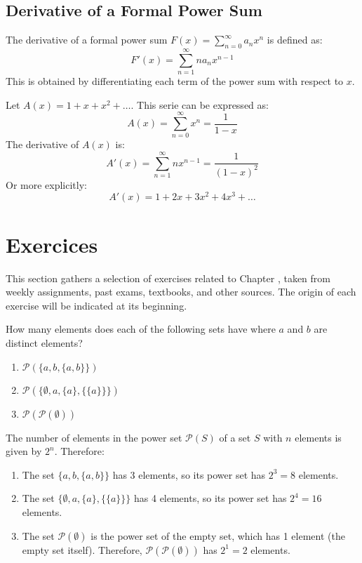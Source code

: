 \subsection{Derivative of a Formal Power Sum}
\begin{definition}
    The derivative of a formal power sum $F(x) = \sum_{n=0}^{\infty} a_n x^n$ is defined as:
    \[ F'(x) = \sum_{n=1}^{\infty} n a_n x^{n-1} \]
    This is obtained by differentiating each term of the power sum with respect to $x$.
\end{definition}

\begin{eg}
    Let $A(x) = 1 + x + x^2 + \ldots$. This serie can be expressed as:
    \[ A(x) = \sum_{n=0}^{\infty} x^n = \frac{1}{1 - x} \]
    The derivative of $A(x)$ is:
    \[ A'(x) = \sum_{n=1}^{\infty} n x^{n-1} = \frac{1}{(1 - x)^2} \]
    Or more explicitly:
    \[ A'(x) = 1 + 2x + 3x^2 + 4x^3 + \ldots \]
\end{eg}

\section{Exercices}
This section gathers a selection of exercises related to Chapter \thechapter, taken from weekly assignments, past exams, textbooks, and other sources. The origin of each exercise will be indicated at its beginning.

\begin{exercise}[Explique AI]
    How many elements does each of the following sets have where $a$ and $b$ are distinct elements?
    \begin{enumerate}[label=(\alph*),itemsep=1pt]
        \item $\mathcal{P}(\{a, b, \{a, b\}\})$
        \item $\mathcal{P}(\{\emptyset, a, \{a\}, \{\{a\}\}\})$
        \item $\mathcal{P}(\mathcal{P}(\emptyset))$
    \end{enumerate}
    \Answer
    The number of elements in the power set $\mathcal{P}(S)$ of a set $S$ with $n$ elements is given by $2^n$. Therefore:
    \begin{enumerate}[label=(\alph*),itemsep=1pt]
        \item The set $\{a, b, \{a, b\}\}$ has 3 elements, so its power set has $2^3 = 8$ elements.
        \item The set $\{\emptyset, a, \{a\}, \{\{a\}\}\}$ has 4 elements, so its power set has $2^4 = 16$ elements.
        \item The set $\mathcal{P}(\emptyset)$ is the power set of the empty set, which has 1 element (the empty set itself). Therefore, $\mathcal{P}(\mathcal{P}(\emptyset))$ has $2^1 = 2$ elements.
    \end{enumerate}
\end{exercise}